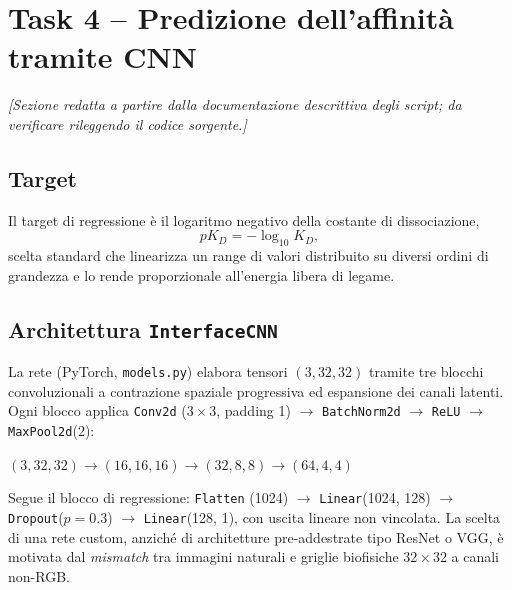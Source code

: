 \documentclass[11pt,a4paper]{article}
\begin{document}
\section{Task 4 -- Predizione dell'affinità tramite CNN}
\label{sec:task4}

\emph{[Sezione redatta a partire dalla documentazione descrittiva degli script; da verificare rileggendo il codice sorgente.]}

\subsection{Target}
Il target di regressione è il logaritmo negativo della costante di dissociazione,
\[
pK_D = -\log_{10} K_D ,
\]
scelta standard che linearizza un range di valori distribuito su diversi ordini di grandezza e lo rende proporzionale all'energia libera di legame.

\subsection{Architettura \texttt{InterfaceCNN}}
La rete (PyTorch, \texttt{models.py}) elabora tensori $(3,32,32)$ tramite tre blocchi convoluzionali a contrazione spaziale progressiva ed espansione dei canali latenti. Ogni blocco applica \texttt{Conv2d} ($3\times3$, padding 1) $\rightarrow$ \texttt{BatchNorm2d} $\rightarrow$ \texttt{ReLU} $\rightarrow$ \texttt{MaxPool2d}($2$):
\begin{center}
$(3,32,32) \rightarrow (16,16,16) \rightarrow (32,8,8) \rightarrow (64,4,4)$
\end{center}
Segue il blocco di regressione: \texttt{Flatten} (1024) $\rightarrow$ \texttt{Linear}(1024, 128) $\rightarrow$ \texttt{Dropout}($p=0.3$) $\rightarrow$ \texttt{Linear}(128, 1), con uscita lineare non vincolata. La scelta di una rete custom, anziché di architetture pre-addestrate tipo ResNet o VGG, è motivata dal \emph{mismatch} tra immagini naturali e griglie biofisiche $32\times32$ a canali non-RGB.
\end{document}
